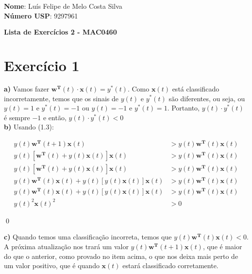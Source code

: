 \documentclass[12pt,letterpaper]{article}
\begin{document}
	
	\textbf{Nome}: Luís Felipe de Melo Costa Silva \\
	\textbf{Número USP}: 9297961 
	
	\begin{center}
		\LARGE \bf
		Lista de Exercícios 2 - MAC0460
	\end{center}
	
	\section*{Exercício 1}
		
	\textbf{a)} Vamos fazer $\mathbf{w}^\mathbf{T}(t) \cdot \mathbf{x}(t) = y^*(t)$. Como $\mathbf{x}(t)$ está classificado incorretamente, temos que os sinais de $y(t)$ e $y^*(t)$ são diferentes, ou seja, ou $y(t) = 1$ e $y^*(t) = -1$ ou $y(t) = -1$ e $y^*(t) = 1$. Portanto, $y(t) \cdot y^*(t)$ é sempre $-1$ e então, $y(t) \cdot y^*(t) < 0$ \\
		
	\textbf{b)} Usando (1.3):
	
	\begin{equation*}
		\begin{split}
			y(t)\mathbf{w}^\mathbf{T}(t+1)\mathbf{x}(t) & > y(t)\mathbf{w}^\mathbf{T}(t)\mathbf{x}(t) \\
			y(t)[\mathbf{w}^\mathbf{T}(t) + y(t)\mathbf{x}(t)]\mathbf{x}(t) & > y(t)\mathbf{w}^\mathbf{T}(t)\mathbf{x}(t) \\
			y(t)[\mathbf{w}^\mathbf{T}(t) + y(t)\mathbf{x}(t)]\mathbf{x}(t) & > y(t)\mathbf{w}^\mathbf{T}(t)\mathbf{x}(t) \\
			y(t)\mathbf{w}^\mathbf{T}(t)\mathbf{x}(t) + y(t)[y(t)\mathbf{x}(t)]\mathbf{x}(t) & > y(t)\mathbf{w}^\mathbf{T}(t)\mathbf{x}(t) \\
			y(t)\mathbf{w}^\mathbf{T}(t)\mathbf{x}(t) + y(t)[y(t)\mathbf{x}(t)]\mathbf{x}(t) & > y(t)\mathbf{w}^\mathbf{T}(t)\mathbf{x}(t) \\
			y(t)^2\mathbf{x}(t)^2 & > 0 
		\end{split}
	\end{equation*}

	\qed
	
	\textbf{c)} Quando temos uma classificação incorreta, temos que $y(t)\mathbf{w}^\mathbf{T}(t)\mathbf{x}(t) < 0$. A próxima atualização nos trará um valor $y(t)\mathbf{w}^\mathbf{T}(t+1)\mathbf{x}(t)$, que é maior do que o anterior, como provado no item acima, o que nos deixa mais perto de um valor positivo, que é quando $\mathbf{x}(t)$ estará classificado corretamente.
 	
\end{document}
